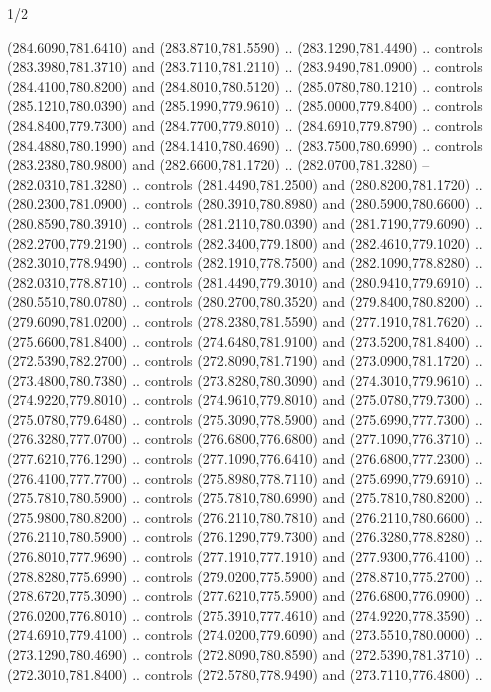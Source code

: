 \begin{flagdescription}{1/2}
\begin{scope}[xshift=0.5\flaglength]
\begin{scope}[scale=0.00745\flagwidth,xshift=-12.1mm,yshift=41.7mm]
\begin{scope}[y=0.80pt, x=0.80pt, yscale=-1, xscale=1, inner sep=0pt, outer sep=0pt]
\begin{scope}[cm={{1.33333,0.0,0.0,-1.33333,(0.0,114.66667)}}]
\begin{scope}[scale=0.100]
  (284.6090,781.6410) and (283.8710,781.5590) .. (283.1290,781.4490) .. controls
  (283.3980,781.3710) and (283.7110,781.2110) .. (283.9490,781.0900) .. controls
  (284.4100,780.8200) and (284.8010,780.5120) .. (285.0780,780.1210) .. controls
  (285.1210,780.0390) and (285.1990,779.9610) .. (285.0000,779.8400) .. controls
  (284.8400,779.7300) and (284.7700,779.8010) .. (284.6910,779.8790) .. controls
  (284.4880,780.1990) and (284.1410,780.4690) .. (283.7500,780.6990) .. controls
  (283.2380,780.9800) and (282.6600,781.1720) .. (282.0700,781.3280) --
  (282.0310,781.3280) .. controls (281.4490,781.2500) and (280.8200,781.1720) ..
  (280.2300,781.0900) .. controls (280.3910,780.8980) and (280.5900,780.6600) ..
  (280.8590,780.3910) .. controls (281.2110,780.0390) and (281.7190,779.6090) ..
  (282.2700,779.2190) .. controls (282.3400,779.1800) and (282.4610,779.1020) ..
  (282.3010,778.9490) .. controls (282.1910,778.7500) and (282.1090,778.8280) ..
  (282.0310,778.8710) .. controls (281.4490,779.3010) and (280.9410,779.6910) ..
  (280.5510,780.0780) .. controls (280.2700,780.3520) and (279.8400,780.8200) ..
  (279.6090,781.0200) .. controls (278.2380,781.5590) and (277.1910,781.7620) ..
  (275.6600,781.8400) .. controls (274.6480,781.9100) and (273.5200,781.8400) ..
  (272.5390,782.2700) .. controls (272.8090,781.7190) and (273.0900,781.1720) ..
  (273.4800,780.7380) .. controls (273.8280,780.3090) and (274.3010,779.9610) ..
  (274.9220,779.8010) .. controls (274.9610,779.8010) and (275.0780,779.7300) ..
  (275.0780,779.6480) .. controls (275.3090,778.5900) and (275.6990,777.7300) ..
  (276.3280,777.0700) .. controls (276.6800,776.6800) and (277.1090,776.3710) ..
  (277.6210,776.1290) .. controls (277.1090,776.6410) and (276.6800,777.2300) ..
  (276.4100,777.7700) .. controls (275.8980,778.7110) and (275.6990,779.6910) ..
  (275.7810,780.5900) .. controls (275.7810,780.6990) and (275.7810,780.8200) ..
  (275.9800,780.8200) .. controls (276.2110,780.7810) and (276.2110,780.6600) ..
  (276.2110,780.5900) .. controls (276.1290,779.7300) and (276.3280,778.8280) ..
  (276.8010,777.9690) .. controls (277.1910,777.1910) and (277.9300,776.4100) ..
  (278.8280,775.6990) .. controls (279.0200,775.5900) and (278.8710,775.2700) ..
  (278.6720,775.3090) .. controls (277.6210,775.5900) and (276.6800,776.0900) ..
  (276.0200,776.8010) .. controls (275.3910,777.4610) and (274.9220,778.3590) ..
  (274.6910,779.4100) .. controls (274.0200,779.6090) and (273.5510,780.0000) ..
  (273.1290,780.4690) .. controls (272.8090,780.8590) and (272.5390,781.3710) ..
  (272.3010,781.8400) .. controls (272.5780,778.9490) and (273.7110,776.4800) ..

\end{scope}
\end{scope}
\end{scope}
\end{scope}
\end{scope}
\end{flagdescription}
